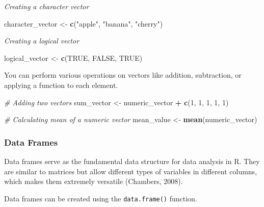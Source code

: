 \documentclass[
]{book}
\newenvironment{Shaded}{\begin{snugshade}}{\end{snugshade}}
\newcommand{\CommentTok}[1]{\textcolor[rgb]{0.56,0.35,0.01}{\textit{#1}}}
\newcommand{\ConstantTok}[1]{\textcolor[rgb]{0.56,0.35,0.01}{#1}}
\newcommand{\DecValTok}[1]{\textcolor[rgb]{0.00,0.00,0.81}{#1}}
\newcommand{\FunctionTok}[1]{\textcolor[rgb]{0.13,0.29,0.53}{\textbf{#1}}}
\newcommand{\NormalTok}[1]{#1}
\newcommand{\OtherTok}[1]{\textcolor[rgb]{0.56,0.35,0.01}{#1}}
\newcommand{\SpecialCharTok}[1]{\textcolor[rgb]{0.81,0.36,0.00}{\textbf{#1}}}
\newcommand{\StringTok}[1]{\textcolor[rgb]{0.31,0.60,0.02}{#1}}
\begin{document}
\emph{Creating a character vector}

\begin{Shaded}
\begin{Highlighting}[]
\NormalTok{character\_vector }\OtherTok{\textless{}{-}} \FunctionTok{c}\NormalTok{(}\StringTok{"apple"}\NormalTok{, }\StringTok{"banana"}\NormalTok{, }\StringTok{"cherry"}\NormalTok{)}
\end{Highlighting}
\end{Shaded}

\emph{Creating a logical vector}

\begin{Shaded}
\begin{Highlighting}[]
\NormalTok{logical\_vector }\OtherTok{\textless{}{-}} \FunctionTok{c}\NormalTok{(}\ConstantTok{TRUE}\NormalTok{, }\ConstantTok{FALSE}\NormalTok{, }\ConstantTok{TRUE}\NormalTok{)}
\end{Highlighting}
\end{Shaded}

You can perform various operations on vectors like addition, subtraction, or applying a function to each element.

\begin{Shaded}
\begin{Highlighting}[]
\CommentTok{\# Adding two vectors}
\NormalTok{sum\_vector }\OtherTok{\textless{}{-}}\NormalTok{ numeric\_vector }\SpecialCharTok{+} \FunctionTok{c}\NormalTok{(}\DecValTok{1}\NormalTok{, }\DecValTok{1}\NormalTok{, }\DecValTok{1}\NormalTok{, }\DecValTok{1}\NormalTok{, }\DecValTok{1}\NormalTok{)}

\CommentTok{\# Calculating mean of a numeric vector}
\NormalTok{mean\_value }\OtherTok{\textless{}{-}} \FunctionTok{mean}\NormalTok{(numeric\_vector)}
\end{Highlighting}
\end{Shaded}

\subsubsection*{Data Frames}\label{data-frames}

Data frames serve as the fundamental data structure for data analysis in R. They are similar to matrices but allow different types of variables in different columns, which makes them extremely versatile (Chambers, 2008).

Data frames can be created using the \texttt{data.frame()} function.
\end{document}
